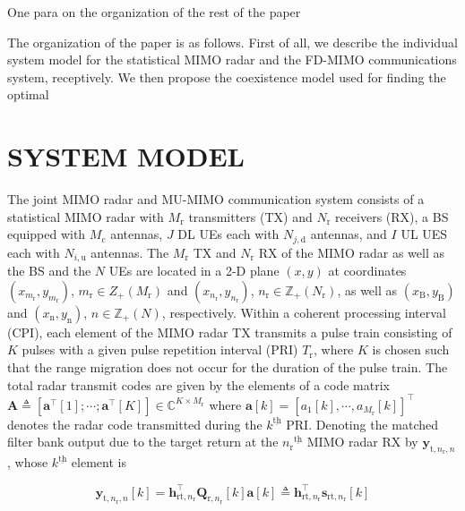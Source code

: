 \documentclass[conference]{IEEEtran}
\newcommand{\bracket}[1]{{\left [{#1}\right ]}}
\newcommand{\ith}[1]    {{#1}^{\underline{\text{th}}}}
\newcommand{\rr}{_\mathrm{r}}
\begin{document}
\color{red}
One para on the organization of the rest of the paper

\color{blue}
The organization of the paper is as follows. \color{magenta} First of all, we describe the individual system model for the statistical MIMO radar and the FD-MIMO communications system, receptively. We then propose the coexistence model used for finding the optimal 
\color{black}
\section{SYSTEM MODEL}
\label{sec:system model}
The joint MIMO radar and MU-MIMO communication system consists of a statistical MIMO radar with $M_\mathrm{r}$ transmitters (TX) and $N_\mathrm{r}$ receivers (RX), a BS equipped with $M_\mathrm{c}$ antennas, $J$ DL UEs each with $N_{j,\textrm{d}}$ antennas, and $I$ UL UES each with $N_{i,\textrm{u}}$ antennas.   The $M_\mathrm{r}$ TX and $N_\mathrm{r}$ RX of the MIMO radar as well as the BS and the $N$ UEs are located in a 2-D plane $\left(x,y \right)$ at coordinates $\left(x_{m_\mathrm{r}},y_{m_\mathrm{r}}\right)$, $m_\mathrm{r}\in{Z}_{+}(M_\mathrm{r})$ and $\left(x_{n_\mathrm{r}},y_{n_\mathrm{r}} \right)$, $n_\mathrm{r}\in\mathbb{Z}_{+}(N_\mathrm{r})$, as well as $(x_{\mathrm{B}},y_{\mathrm{B}})$ and $(x_{\mathrm{n}},y_{\mathrm{n}})$, $n\in\mathbb{Z}_{+}(N)$, respectively.
Within a coherent processing interval (CPI), each element of the MIMO radar TX transmits a pulse train consisting of $K$ pulses with a given pulse repetition interval (PRI) $T_\mathrm{r}$, where $K$ is chosen such that the range migration does not occur for the duration of the pulse train\cite{Xiaodong_Overlaid}. The total radar transmit codes are given by the elements of a code matrix $\mathbf{A}\triangleq\bracket{\mathbf{a}^\top\bracket{1};\cdots; \mathbf{a}^\top\bracket{K}}\in\mathbb{C}^{K\times M\rr}$ where $\mathbf{a}\bracket{k}=\bracket{a_{1}\bracket{k},\cdots,a_{M\rr}\bracket{k}}^\top$ denotes the radar code transmitted during the $\ith{k}$ PRI. Denoting the matched filter bank output due to the target return at the $\ith{n\rr}$ MIMO radar RX by $\mathbf{y}_{\mathrm{t},n\rr,n}$, whose $\ith{k}$ element is\par\noindent\small 
\begin{equation}
\label{radar range cell}
		\mathbf{y}_{\mathrm{t},n\rr,n}\bracket{k}=\mathbf{h}^\top_{\mathrm{rt},n\rr}\mathbf{Q}_{\mathrm{r,}n\rr}\bracket{k}\mathbf{a}\bracket{k}\triangleq\mathbf{h}^\top_{\mathrm{rt},n\rr}\mathbf{s}_{\mathrm{rt,}n\rr}\bracket{k}
\end{equation}\normalsize
\end{document}
